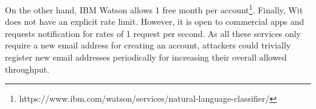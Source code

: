 On the other hand, IBM Watson allows 1 free month per account\footnote{https://www.ibm.com/watson/services/natural-language-classifier/}.
Finally, Wit does not have an explicit rate limit. However, it is open to commercial
apps and requests notification for rates of 1 request per second. As all these services 
only require a new email address for creating an account, attackers could trivially register 
new email addresses periodically for increasing their overall allowed throughput.

